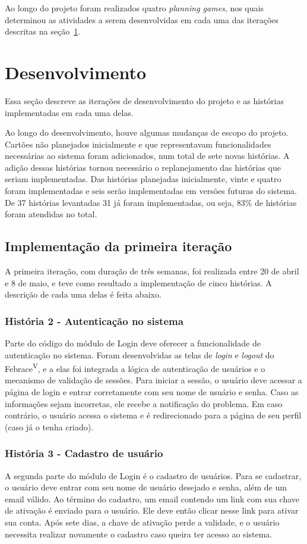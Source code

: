     Ao longo do projeto foram realizados quatro \textit{planning games}, nos quais determinou as atividades a serem desenvolvidas em cada uma das iterações descritas na seção~\ref{iteracoes}.

\section{Desenvolvimento}\label{iteracoes}

  Essa seção descreve as iterações de desenvolvimento do projeto e as histórias implementadas em cada uma delas.

  Ao longo do desenvolvimento, houve algumas mudanças de escopo do projeto. Cartões não planejados inicialmente e que representavam funcionalidades necessárias ao sistema foram adicionados, num total de sete novas histórias. A adição dessas histórias tornou necessário o replanejamento das histórias que seriam implementadas. Das histórias planejadas inicialmente, vinte e quatro foram implementadas e seis serão implementadas em versões futuras do sistema. De 37 histórias levantadas 31 já foram implementadas, ou seja, 83\% de histórias foram atendidas no total.

  \subsection{Implementação da primeira iteração}
    A primeira iteração, com duração de três semanas, foi realizada entre 20 de abril e 8 de maio, e teve como resultado a implementação de cinco histórias. A descrição de cada uma delas é feita abaixo.

    \subsubsection{História 2 - Autenticação no sistema}
      Parte do código do módulo de Login deve oferecer a funcionalidade de autenticação no sistema. Foram desenvolvidas as telas de \textit{login} e \textit{logout} do Febrace\textsuperscript{V}, e a elas foi integrada a lógica de autenticação de usuários e o mecanismo de validação de sessões. Para iniciar a sessão, o usuário deve acessar a página de login e entrar corretamente com seu nome de usuário e senha. Caso as informações sejam incorretas, ele recebe a notificação do problema. Em caso contrário, o usuário acessa o sistema e é redirecionado para a página de seu perfil (caso já o tenha criado).

    \subsubsection{História 3 - Cadastro de usuário}
      A segunda parte do módulo de Login é o cadastro de usuários. Para se cadastrar, o usuário deve entrar com seu nome de usuário desejado e senha, além de um email válido. Ao término do cadastro, um email contendo um link com sua chave de ativação é enviado para o usuário. Ele deve então clicar nesse link para ativar sua conta. Após sete dias, a chave de ativação perde a validade, e o usuário necessita realizar novamente o cadastro caso queira ter acesso ao sistema.

